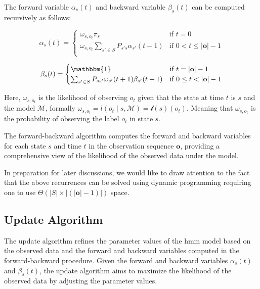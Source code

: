 The forward variable $\alpha_s(t)$ and backward variable $\beta_s(t)$ can be computed recursively as follows:

\begin{equation}
    \alpha_s(t) =
    \begin{cases}
        \omega_{s, o_t} \pi_s & \text{if } t = 0 \\
        \omega_{s, o_t} \sum_{s' \in S} P_{s's}\alpha_{s'}(t - 1) & \text{if } 0 < t \leq |\mathbf{o}| - 1 \\
    \end{cases}
    \label{eq:forward-recursive}
\end{equation}


\begin{equation}
    \beta_s(t) =
    \begin{cases}
        \mathbbm{1} & \text{if } t = |\mathbf{o}| - 1 \\
        \sum_{s' \in S} P_{ss'} \omega_{s'}(t + 1) \beta_{s'}(t + 1) & \text{if } 0 \leq t < |\mathbf{o}| - 1 \\
    \end{cases}
    \label{eq:backward-recursive}
\end{equation}


Here, $\omega_{s, o_t}$ is the likelihood of observing $o_t$ given that the state at time $t$ is $s$ and the model $\mathcal{M}$, formally $\omega_{s, o_t} = l(o_t \mid s, \mathcal{M}) = \mathscr{l}(s)(o_t)$.
Meaning that $\omega_{s, o_t}$ is the probability of observing the label $o_t$ in state $s$.

The forward-backward algorithm computes the forward and backward variables for each state $s$ and time $t$ in the observation sequence $\mathbf{o}$, providing a comprehensive view of the likelihood of the observed data under the model.

In preparation for later discussions, we would like to draw attention to the fact that the above recurrences can be solved using dynamic programming requiring one to use $\Theta(|S|\times|(|\mathbf{o}|-1)|)$ space.

\subsection{Update Algorithm}\label{subsec:update-algorithm}
The update algorithm refines the parameter values of the \gls{hmm} model based on the observed data and the forward and backward variables computed in the forward-backward procedure.
Given the forward and backward variables $\alpha_s(t)$ and $\beta_s(t)$, the update algorithm aims to maximize the likelihood of the observed data by adjusting the parameter values.


